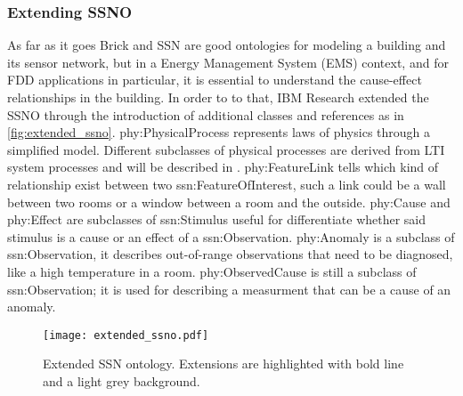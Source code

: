 \subsubsection{Extending SSNO} \label{ssubsec:extended_ssno}
As far as it goes Brick and SSN are good ontologies for modeling a building and its sensor network, but in a Energy Management System (EMS) context, and for FDD applications in particular, it is essential to understand the cause-effect relationships in the building. In order to to that, IBM Research extended the SSNO through the introduction of additional classes and references as in \autoref{fig:extended_ssno}. phy:PhysicalProcess represents laws of physics through a simplified model. Different subclasses of physical processes are derived from LTI system processes and will be described in . %
phy:FeatureLink tells which kind of relationship exist between two ssn:FeatureOfInterest, such a link could be a wall between two rooms or a window between a room and the outside. phy:Cause and phy:Effect are subclasses of ssn:Stimulus useful for differentiate whether said stimulus is a cause or an effect of a ssn:Observation. phy:Anomaly is a subclass of ssn:Observation, it describes out-of-range observations that need to be diagnosed, like a high temperature in a room. phy:ObservedCause is still a subclass of ssn:Observation; it is used for describing a measurment that can be a cause of an anomaly.

\begin{figure}
  \texttt{[image: extended\_ssno.pdf]}
  \caption{Extended SSN ontology. Extensions are highlighted with bold line and a light grey background.}
  \label{fig:extended_ssno}
\end{figure}
